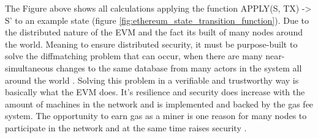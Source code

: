 The Figure above shows all calculations applying the function APPLY(S, TX) -> S' to an example state (figure \ref{fig:ethereum_state_transition_function}). Due to the distributed nature of the \ac{EVM} and the fact its built of many nodes around the world. Meaning to ensure distributed security, it must be purpose-built to solve the diffmatching problem that can occur, when there are many near-simultaneous changes to the same database from many actors in the system all around the world . Solving this problem in a verifiable and trustworthy way is basically what the \ac{EVM} does. It's resilience and security does increase with the amount of machines in the network and is implemented and backed by the gas fee system. The opportunity to earn gas as a miner is one reason for many nodes to participate in the network and at the same time raises security \cite{dannen2017introducing}.


 
\clearpage


